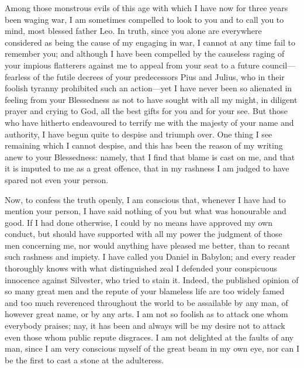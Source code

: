 Among those monstrous evils of this age with which I have now for three
years been waging war, I am sometimes compelled to look to you and to call
you to mind, most blessed father Leo. In truth, since you alone are
everywhere considered as being the cause of my engaging in war, I cannot
at any time fail to remember you; and although I have been compelled by
the causeless raging of your impious flatterers against me to appeal from
your seat to a future council—fearless of the futile decrees of your
predecessors Pius and Julius, who in their foolish tyranny prohibited such
an action—yet I have never been so alienated in feeling from your
Blessedness as not to have sought with all my might, in diligent prayer
and crying to God, all the best gifts for you and for your see. But those
who have hitherto endeavoured to terrify me with the majesty of your name
and authority, I have begun quite to despise and triumph over. One thing I
see remaining which I cannot despise, and this has been the reason of my
writing anew to your Blessedness: namely, that I find that blame is cast
on me, and that it is imputed to me as a great offence, that in my
rashness I am judged to have spared not even your person.

Now, to confess the truth openly, I am conscious that, whenever I have had
to mention your person, I have said nothing of you but what was honourable
and good. If I had done otherwise, I could by no means have approved my
own conduct, but should have supported with all my power the judgment of
those men concerning me, nor would anything have pleased me better, than
to recant such rashness and impiety. I have called you Daniel in Babylon;
and every reader thoroughly knows with what distinguished zeal I defended
your conspicuous innocence against Silvester, who tried to stain it.
Indeed, the published opinion of so many great men and the repute of your
blameless life are too widely famed and too much reverenced throughout the
world to be assailable by any man, of however great name, or by any arts.
I am not so foolish as to attack one whom everybody praises; nay, it has
been and always will be my desire not to attack even those whom public
repute disgraces. I am not delighted at the faults of any man, since I am
very conscious myself of the great beam in my own eye, nor can I be the
first to cast a stone at the adulteress.

